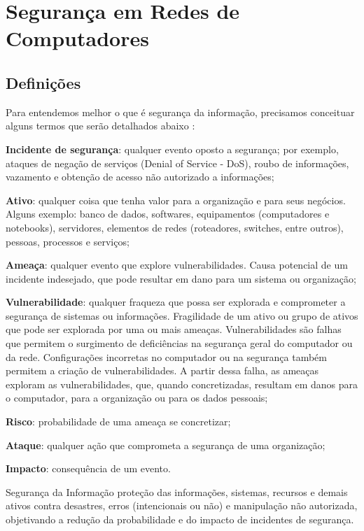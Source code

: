 \chapter{Segurança em Redes de Computadores} \label{ch:segurança}
\section{Definições} \label{sec:definições}

Para entendemos melhor o que é segurança da informação, precisamos conceituar alguns termos que serão detalhados abaixo \cite{esr-gestao}:

\begin{alineas}
 \item \textbf{Incidente de segurança}: qualquer evento oposto a segurança; por exemplo, ataques de negação de serviços (Denial of Service - DoS), roubo de informações, vazamento e obtenção de acesso não autorizado a informações;
 \item \textbf{Ativo}: qualquer coisa que tenha valor para a organização e para seus negócios. Alguns exemplo: banco de dados, softwares, equipamentos (computadores e notebooks), servidores, elementos de redes (roteadores, switches, entre outros), pessoas, processos e serviços;
 \item \textbf{Ameaça}: qualquer evento que explore vulnerabilidades. Causa potencial de um incidente indesejado, que pode resultar em dano para um sistema ou organização;
 \item \textbf{Vulnerabilidade}: qualquer fraqueza que possa ser explorada e comprometer a segurança de sistemas ou informações. Fragilidade de um ativo ou grupo de ativos que pode ser explorada por uma ou mais ameaças. Vulnerabilidades são falhas que permitem o surgimento de deficiências na segurança geral do computador ou da rede. Configurações incorretas no computador ou na segurança também permitem a criação de vulnerabilidades. A partir dessa falha, as ameaças exploram as vulnerabilidades, que, quando concretizadas, resultam em danos para o computador, para a organização ou para os dados pessoais;
 \item \textbf{Risco}: probabilidade de uma ameaça se concretizar;
 \item \textbf{Ataque}: qualquer ação que comprometa a segurança de uma organização;
 \item \textbf{Impacto}: consequência de um evento.
\end{alineas}

Segurança da Informação proteção das informações, sistemas, recursos e demais ativos contra desastres, erros (intencionais ou não) e manipulação não autorizada, objetivando a redução da probabilidade e do impacto de incidentes de segurança.

